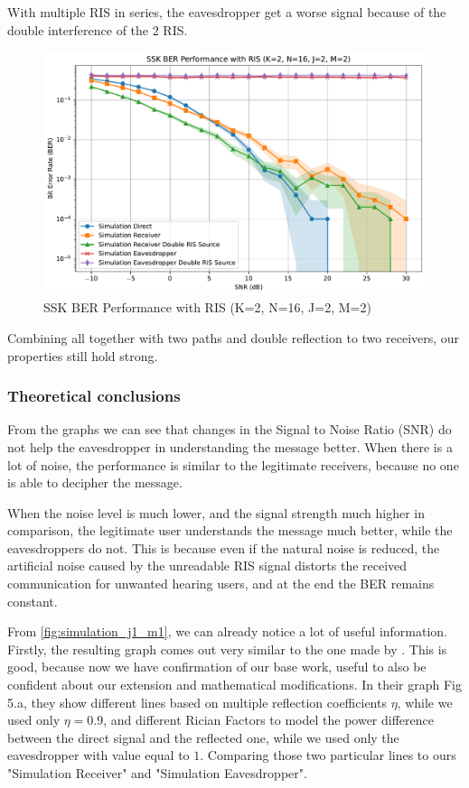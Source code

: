 With multiple RIS in series, the eavesdropper get a worse signal because of the double interference of the 2 RIS.

\begin{figure}[H]
  \centering
  \includegraphics[width=0.8\linewidth]{imgs/ber-simulations/SSK BER Performance with RIS (K=2, N=16, J=2, M=2) ci.pdf}
  \caption{SSK BER Performance with RIS (K=2, N=16, J=2, M=2)}
  \label{fig:simulation_j2_m2}
\end{figure}

Combining all together with two paths and double reflection to two receivers, our properties still hold strong.

\subsubsection{Theoretical conclusions}

From the graphs we can see that changes in the Signal to Noise Ratio (SNR) do not help the eavesdropper in understanding the message better. When there is a lot of noise, the performance is similar to the legitimate receivers, because no one is able to decipher the message.

When the noise level is much lower, and the signal strength much higher in comparison, the legitimate user understands the message much better, while the eavesdroppers do not. This is because even if the natural noise is reduced, the artificial noise caused by the unreadable RIS signal distorts the received communication for unwanted hearing users, and at the end the BER remains constant.

From \cref{fig:simulation_j1_m1}, we can already notice a lot of useful information. Firstly, the resulting graph comes out very similar to the one made by \cite{9328149}. This is good, because now we have confirmation of our base work, useful to also be confident about our extension and mathematical modifications. In their graph Fig 5.a, they show different lines based on multiple reflection coefficients $\eta$, while we used only $\eta = 0.9$, and different Rician Factors to model the power difference between the direct signal and the reflected one, while we used only the eavesdropper with value equal to $1$. Comparing those two particular lines to ours "Simulation Receiver" and "Simulation Eavesdropper".

